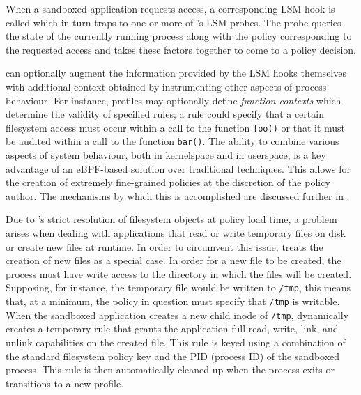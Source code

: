 
When a sandboxed application requests access, a corresponding LSM hook is called which in
turn traps to one or more of \bpfbox{}'s LSM probes. The probe queries the state of the
currently running process along with the policy corresponding to the requested access and
takes these factors together to come to a policy decision.


\bpfbox{} can optionally augment the information provided by the LSM hooks themselves with
additional context obtained by instrumenting other aspects of process behaviour. For
instance, profiles may optionally define \textit{function contexts} which determine the
validity of specified rules; a rule could specify that a certain filesystem access must
occur within a call to the function \texttt{foo()} or that it must be audited within
a call to the function \texttt{bar()}. The ability to combine various aspects of system
behaviour, both in kernelspace and in userspace, is a key advantage of an eBPF-based
solution over traditional techniques. This allows for the creation of extremely
fine-grained policies at the discretion of the policy author. The mechanisms by which this
is accomplished are discussed further in .

Due to \bpfbox{}'s strict resolution of filesystem objects at policy load time, a problem
arises when dealing with applications that read or write temporary files on disk or create
new files at runtime. In order to circumvent this issue, \bpfbox{} treats the creation of
new files as a special case. In order for a new file to be created, the process must have
write access to the directory in which the files will be created.  Supposing, for
instance, the temporary file would be written to \texttt{/tmp}, this means that, at
a minimum, the policy in question must specify that \texttt{/tmp} is writable.  When the
sandboxed application creates a new child inode of \texttt{/tmp}, \bpfbox{} dynamically
creates a temporary rule that grants the application full read, write, link, and unlink
capabilities on the created file. This rule is keyed using a combination of the standard
filesystem policy key and the PID (process ID) of the sandboxed process. This rule is then
automatically cleaned up when the process exits or transitions to a new profile.

